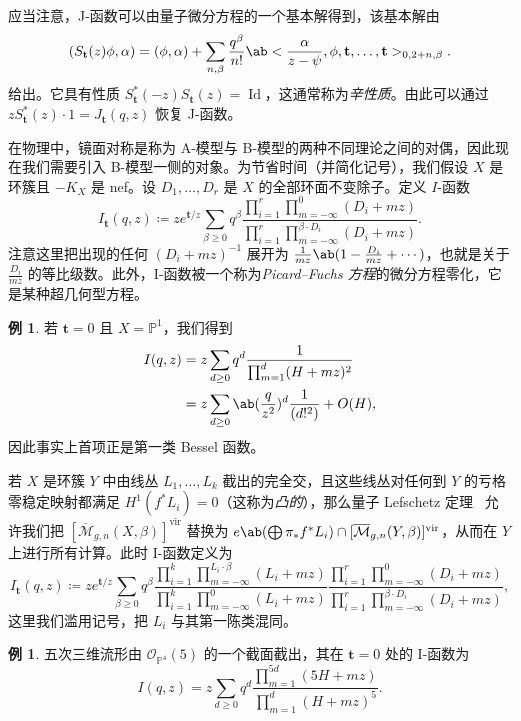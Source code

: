 \documentclass{amsart}
\theoremstyle{definition}
\newtheorem{exm}[thm]{例}
\theoremstyle{remark}
\theoremstyle{plain}
\theoremstyle{definition}
\theoremstyle{remark}
\renewcommand{\P}{\mathbb{P}}
\newcommand{\Mbar}{\overline{\mathcal{M}}}
\newcommand{\mc}[1]{\mathcal{#1}}
\newcommand{\mbf}[1]{\mathbf{#1}}
\newcommand{\mr}[1]{\mathrm{#1}}
\newcommand{\on}[1]{\operatorname{#1}}
\newcommand{\1}{\mathbf{1}}
\newcommand{\2}{\mathbf{2}}
\newcommand{\3}{\mathbf{3}}
\newcommand{\vir}{\mr{vir}}
\begin{document}
应当注意，J-函数可以由量子微分方程的一个基本解得到，该基本解由
\[ ( S_{\mbf{t}}(z) \phi , \alpha) = (\phi, \alpha) + \sum_{n, \beta} \frac{q^{\beta}}{n!} \ab<\frac{\alpha}{z-\psi}, \phi, \mbf{t}, \ldots, \mbf{t}>_{0, 2+n, \beta}. \]
给出。它具有性质 \(S_{\mbf{t}}^*(-z) S_{\mbf{t}}(z) = \on{Id}\)，这通常称为\textit{辛性质}。由此可以通过 \(z S_{\mbf{t}}^*(z)\cdot 1 = J_{\mbf{t}}(q, z)\) 恢复 J-函数。

在物理中，镜面对称是称为 A-模型与 B-模型的两种不同理论之间的对偶，因此现在我们需要引入 B-模型一侧的对象。为节省时间（并简化记号），我们假设 \(X\) 是环簇且 \(-K_X\) 是 nef。设 \(D_1, \ldots, D_r\) 是 \(X\) 的全部环面不变除子。定义 \(I\)-函数
\[
    I_{\mbf{t}}(q, z) \coloneqq z e^{\mbf{t}/z} \sum_{\beta \geq 0} q^{\beta} \frac{\prod_{i=1}^r \prod_{m = -\infty}^{0} (D_i + mz)}{\prod_{i=1}^r \prod_{m=-\infty}^{\beta \cdot D_i} (D_i + mz)}.
\]
注意这里把出现的任何 \((D_i + mz)^{-1}\) 展开为 \(\frac{1}{mz} \ab(1 - \frac{D_i}{mz} + \cdots)\)，也就是关于 \(\frac{D_i}{mz}\) 的等比级数。此外，I-函数被一个称为\textit{Picard--Fuchs 方程}的微分方程零化，它是某种超几何型方程。

\begin{exm}
    若 \(\mbf{t} = 0\) 且 \(X = \P^1\)，我们得到
    \begin{align*}
        I(q,z) &= z\sum_{d \geq 0} q^d \frac{1}{\prod_{m=1}^d (H + mz)^2} \\
        &= z\sum_{d \geq 0} \ab(\frac{q}{z^2})^d \frac{1}{(d!^2)} + O(H),
    \end{align*}
    因此事实上首项正是第一类 Bessel 函数。
\end{exm}

若 \(X\) 是环簇 \(Y\) 中由线丛 \(L_1, \ldots, L_k\) 截出的完全交，且这些线丛对任何到 \(Y\) 的亏格零稳定映射都满足 \(H^1(f^* L_i) = 0\)（这称为\textit{凸的}），那么量子 Lefschetz 定理~\cite{CoatesGivental2007} 允许我们把 \([\Mbar_{g,n}(X, \beta)]^{\vir}\) 替换为 \(e\ab(\bigoplus \pi_* f^* L_i) \cap [\Mbar_{g,n}(Y, \beta)]^{\vir}\)，从而在 \(Y\) 上进行所有计算。此时 I-函数定义为
\[
    I_{\mbf{t}}(q,z) \coloneqq z e^{\mbf{t}/z} \sum_{\beta \geq 0} q^{\beta} \frac{\prod_{i=1}^k \prod_{m=-\infty}^{L_i \cdot \beta} (L_i + mz)}{\prod_{i=1}^k \prod_{m=-\infty}^{0} (L_i + mz)} \frac{\prod_{i=1}^r \prod_{m = -\infty}^{0} (D_i + mz)}{\prod_{i=1}^r \prod_{m=-\infty}^{\beta \cdot D_i} (D_i + mz)},
\]
这里我们滥用记号，把 \(L_i\) 与其第一陈类混同。

\begin{exm}
    五次三维流形由 \(\mc{O}_{\P^4}(5)\) 的一个截面截出，其在 \(\mbf{t} = 0\) 处的 I-函数为
    \[ I(q,z) = z \sum_{d \geq 0} q^d \frac{\prod_{m=1}^{5d}(5H+mz)}{\prod_{m=1}^d (H+mz)^5}. \]
\end{exm}
\end{document}
